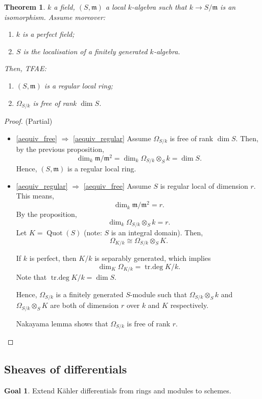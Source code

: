 \documentclass[12pt]{article}
\DeclareMathOperator{\Quot}{Quot}
\DeclareMathOperator{\trdeg}{tr.deg}
\newtheorem*{theorem}{Theorem}
\theoremstyle{definition}
\newtheorem*{goal}{Goal}
\begin{document}
\begin{theorem}
$k$ a field, $(S,\mathfrak{m})$ a local $k$-algebra such that $k\rightarrow S/\mathfrak{m}$ is an isomorphism. Assume moreover:
\begin{enumerate}[label=\arabic*)]
\item $k$ is a perfect field;
\item $S$ is the localisation of a finitely generated $k$-algebra.
\end{enumerate}
Then, TFAE:
\begin{enumerate}[label=\arabic*)]
\item\label{aequiv_regular} $(S,\mathfrak{m})$ is a regular local ring;
\item\label{aequiv_free} $\Omega_{S/k}$ is free of rank $\dim S$.
\end{enumerate}
\end{theorem}

\begin{proof}
(Partial)
\begin{itemize}
\item \ref{aequiv_free} $\Rightarrow$ \ref{aequiv_regular} Assume $\Omega_{S/k}$ is free of rank $\dim S$. Then, by the previous proposition,
\[\dim_k\mathfrak{m}/\mathfrak{m}^2=\dim_k\Omega_{S/k}\otimes_Sk=\dim S.\]
Hence, $(S,\mathfrak{m})$ is a regular local ring.
\item \ref{aequiv_regular} $\Rightarrow$ \ref{aequiv_free} Assume $S$ is regular local of dimension $r$. This means,
\[\dim_k\mathfrak{m}/\mathfrak{m}^2=r.\]
By the proposition,
\[\dim_k\Omega_{S/k}\otimes_Sk=r.\]
Let $K=\Quot(S)$ (note: $S$ is an integral domain). Then,
\[\Omega_{K/k}\cong\Omega_{S/k}\otimes_SK.\]

If $k$ is perfect, then $K/k$ is separably generated, which implies
\[\dim_K\Omega_{K/k}=\trdeg K/k.\]
Note that $\trdeg K/k=\dim S$.

Hence, $\Omega_{S/k}$ is a finitely generated $S$-module such that $\Omega_{S/k}\otimes_Sk$ and $\Omega_{S/k}\otimes_SK$ are both of dimension $r$ over $k$ and $K$ respectively.

Nakayama lemma shows that $\Omega_{S/k}$ is free of rank $r$.
\end{itemize}
\end{proof}

\subsection*{Sheaves of differentials}
\begin{goal}
Extend K\"{a}hler differentials from rings and modules to schemes.
\end{goal}
\end{document}
